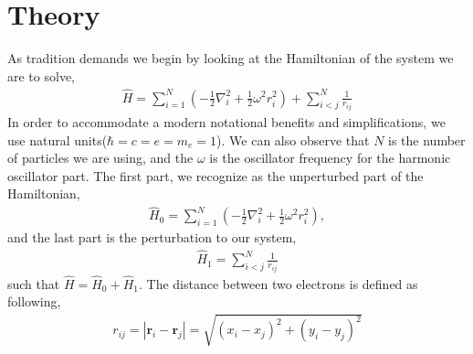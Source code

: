 \documentclass[11pt]{article}
\begin{document}
\section{Theory}
As tradition demands we begin by looking at the Hamiltonian of the system we are to solve,
\begin{align}
	\hat{H} = \sum^N_{i=1} \left( -\frac{1}{2}\nabla^2_i + \frac{1}{2}\omega^2r^2_i \right) + \sum^N_{i<j} \frac{1}{r_{ij}}
	\label{eq:hamiltonian}
\end{align}
In order to accommodate a modern notational benefits and simplifications, we use natural units($\hbar = c = e = m_e = 1$). We can also observe that $N$ is the number of particles we are using, and the $\omega$ is the oscillator frequency for the harmonic oscillator part. The first part, we recognize as the unperturbed part of the Hamiltonian,
\begin{align}
	\hat{H}_0 = \sum^N_{i=1} \left( -\frac{1}{2}\nabla^2_i + \frac{1}{2}\omega^2r^2_i \right),
	\label{eq:hamiltonian_unperturbed}
\end{align}
and the last part is the perturbation to our system,
\begin{align}
	\hat{H}_1 = \sum^N_{i<j} \frac{1}{r_{ij}}
	\label{eq:hamiltonian_perturbed}
\end{align}
such that $\hat{H} = \hat{H}_0 + \hat{H}_1$. The distance between two electrons is defined as following,
\begin{align}
	r_{ij} = |\mathbf{r}_i - \mathbf{r}_j| = \sqrt{(x_i - x_j)^2 + (y_i - y_j)^2}
	\label{eq:electron_distance}
\end{align}
\end{document}
